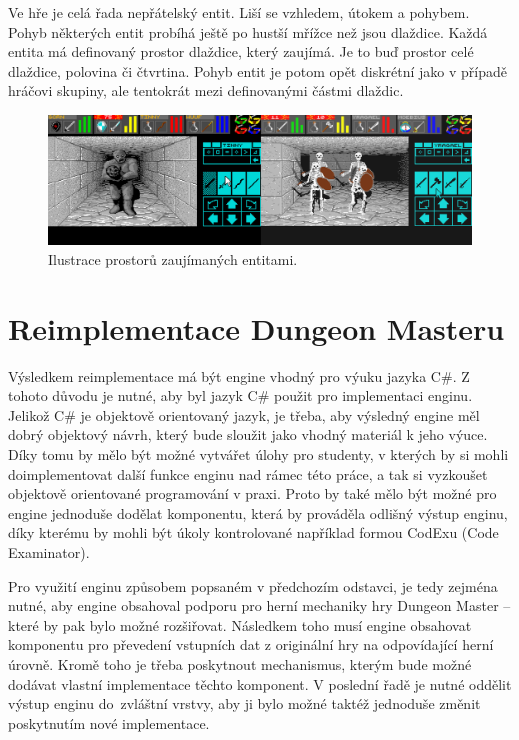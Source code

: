 Ve hře je celá řada nepřátelský entit. Liší se vzhledem, útokem a pohybem. Pohyb některých entit 
probíhá ještě po hustší mřížce než jsou dlaždice. Každá entita má definovaný prostor dlaždice, který zaujímá. Je to buď prostor
celé dlaždice, polovina či čtvrtina.  Pohyb entit je potom opět diskrétní jako v případě hráčovi skupiny, 
ale tentokrát mezi definovanými částmi dlaždic. 

\begin{figure}[H]\centering
\includegraphics[width=\textwidth]{./img/DM-group-example.png}
\caption{Ilustrace prostorů zaujímaných entitami.}
\label{obr2:uvod}
\end{figure}

\section{Reimplementace Dungeon Masteru}

Výsledkem reimplementace má být engine vhodný pro výuku jazyka C\#. Z tohoto důvodu je nutné, aby byl jazyk C\#
použit pro implementaci enginu. Jelikož C\# je objektově orientovaný jazyk,
je třeba, aby výsledný engine měl dobrý objektový návrh, který bude sloužit jako vhodný materiál k jeho výuce. 
Díky tomu by mělo být možné vytvářet úlohy pro studenty, v kterých by si mohli doimplementovat další funkce enginu nad rámec této práce,
a tak si vyzkoušet objektově orientované programování v praxi. Proto by také mělo být možné
pro engine jednoduše dodělat komponentu, která by prováděla odlišný výstup enginu, díky kterému by mohli být 
úkoly kontrolované například formou CodExu (Code Examinator).

Pro využití enginu způsobem popsaném v předchozím odstavci, je tedy zejména nutné, aby engine obsahoval
podporu pro herní mechaniky hry Dungeon Master -- které by pak bylo možné rozšiřovat.  Následkem toho musí engine obsahovat komponentu 
pro převedení vstupních dat z originální hry na odpovídající herní úrovně. Kromě toho je třeba poskytnout mechanismus,
kterým bude možné dodávat vlastní implementace těchto komponent. V poslední řadě je nutné oddělit výstup enginu do~zvláštní vrstvy,
aby ji bylo možné taktéž jednoduše změnit poskytnutím nové implementace. 

